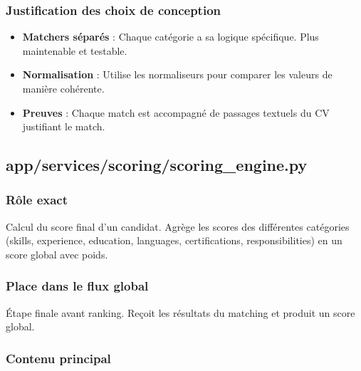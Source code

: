 \documentclass[12pt,a4paper,oneside]{book}
\begin{document}
\subsubsection{Justification des choix de conception}

\begin{itemize}
    \item \textbf{Matchers séparés} : Chaque catégorie a sa logique spécifique. Plus maintenable et testable.
    
    \item \textbf{Normalisation} : Utilise les normaliseurs pour comparer les valeurs de manière cohérente.
    
    \item \textbf{Preuves} : Chaque match est accompagné de passages textuels du CV justifiant le match.
\end{itemize}

\subsection{app/services/scoring/scoring\_engine.py}

\subsubsection{Rôle exact}

Calcul du score final d'un candidat. Agrège les scores des différentes catégories (skills, experience, education, languages, certifications, responsibilities) en un score global avec poids.

\subsubsection{Place dans le flux global}

Étape finale avant ranking. Reçoit les résultats du matching et produit un score global.

\subsubsection{Contenu principal}
\end{document}
